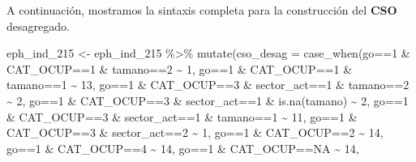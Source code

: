 \documentclass[
]{book}
\newenvironment{Shaded}{\begin{snugshade}}{\end{snugshade}}
\newcommand{\AttributeTok}[1]{\textcolor[rgb]{0.77,0.63,0.00}{#1}}
\newcommand{\ConstantTok}[1]{\textcolor[rgb]{0.00,0.00,0.00}{#1}}
\newcommand{\DecValTok}[1]{\textcolor[rgb]{0.00,0.00,0.81}{#1}}
\newcommand{\FunctionTok}[1]{\textcolor[rgb]{0.00,0.00,0.00}{#1}}
\newcommand{\NormalTok}[1]{#1}
\newcommand{\OtherTok}[1]{\textcolor[rgb]{0.56,0.35,0.01}{#1}}
\newcommand{\SpecialCharTok}[1]{\textcolor[rgb]{0.00,0.00,0.00}{#1}}
\begin{document}
A continuación, mostramos la sintaxis completa para la construcción del \textbf{CSO} desagregado.

\begin{Shaded}
\begin{Highlighting}[]
\NormalTok{eph\_ind\_215 }\OtherTok{\textless{}{-}}\NormalTok{ eph\_ind\_215 }\SpecialCharTok{\%\textgreater{}\%} 
  \FunctionTok{mutate}\NormalTok{(}\AttributeTok{cso\_desag =} \FunctionTok{case\_when}\NormalTok{(go}\SpecialCharTok{==}\DecValTok{1} \SpecialCharTok{\&}\NormalTok{ CAT\_OCUP}\SpecialCharTok{==}\DecValTok{1} \SpecialCharTok{\&}\NormalTok{ tamano}\SpecialCharTok{==}\DecValTok{2} \SpecialCharTok{\textasciitilde{}} \DecValTok{1}\NormalTok{, }
\NormalTok{                               go}\SpecialCharTok{==}\DecValTok{1} \SpecialCharTok{\&}\NormalTok{ CAT\_OCUP}\SpecialCharTok{==}\DecValTok{1} \SpecialCharTok{\&}\NormalTok{ tamano}\SpecialCharTok{==}\DecValTok{1} \SpecialCharTok{\textasciitilde{}} \DecValTok{13}\NormalTok{, }
\NormalTok{                               go}\SpecialCharTok{==}\DecValTok{1} \SpecialCharTok{\&}\NormalTok{ CAT\_OCUP}\SpecialCharTok{==}\DecValTok{3} \SpecialCharTok{\&}\NormalTok{ sector\_act}\SpecialCharTok{==}\DecValTok{1} \SpecialCharTok{\&}\NormalTok{ tamano}\SpecialCharTok{==}\DecValTok{2} \SpecialCharTok{\textasciitilde{}} \DecValTok{2}\NormalTok{, }
\NormalTok{                               go}\SpecialCharTok{==}\DecValTok{1} \SpecialCharTok{\&}\NormalTok{ CAT\_OCUP}\SpecialCharTok{==}\DecValTok{3} \SpecialCharTok{\&}\NormalTok{ sector\_act}\SpecialCharTok{==}\DecValTok{1} \SpecialCharTok{\&} \FunctionTok{is.na}\NormalTok{(tamano) }\SpecialCharTok{\textasciitilde{}} \DecValTok{2}\NormalTok{, }
\NormalTok{                               go}\SpecialCharTok{==}\DecValTok{1} \SpecialCharTok{\&}\NormalTok{ CAT\_OCUP}\SpecialCharTok{==}\DecValTok{3} \SpecialCharTok{\&}\NormalTok{ sector\_act}\SpecialCharTok{==}\DecValTok{1} \SpecialCharTok{\&}\NormalTok{ tamano}\SpecialCharTok{==}\DecValTok{1} \SpecialCharTok{\textasciitilde{}} \DecValTok{11}\NormalTok{, }
\NormalTok{                               go}\SpecialCharTok{==}\DecValTok{1} \SpecialCharTok{\&}\NormalTok{ CAT\_OCUP}\SpecialCharTok{==}\DecValTok{3} \SpecialCharTok{\&}\NormalTok{ sector\_act}\SpecialCharTok{==}\DecValTok{2} \SpecialCharTok{\textasciitilde{}} \DecValTok{1}\NormalTok{,}
\NormalTok{                               go}\SpecialCharTok{==}\DecValTok{1} \SpecialCharTok{\&}\NormalTok{ CAT\_OCUP}\SpecialCharTok{==}\DecValTok{2} \SpecialCharTok{\textasciitilde{}} \DecValTok{14}\NormalTok{,}
\NormalTok{                               go}\SpecialCharTok{==}\DecValTok{1} \SpecialCharTok{\&}\NormalTok{ CAT\_OCUP}\SpecialCharTok{==}\DecValTok{4} \SpecialCharTok{\textasciitilde{}} \DecValTok{14}\NormalTok{,}
\NormalTok{                               go}\SpecialCharTok{==}\DecValTok{1} \SpecialCharTok{\&}\NormalTok{ CAT\_OCUP}\SpecialCharTok{==}\ConstantTok{NA} \SpecialCharTok{\textasciitilde{}} \DecValTok{14}\NormalTok{,}
                               

\end{Highlighting}
\end{Shaded}
\end{document}
